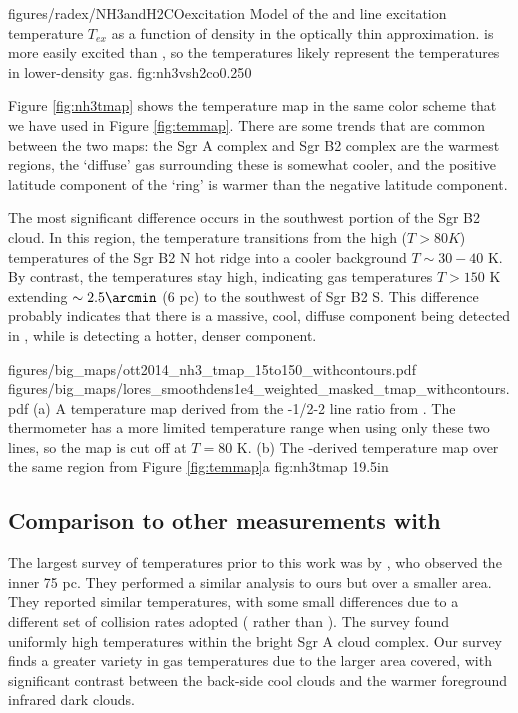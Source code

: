 \Figure
{figures/radex/NH3andH2COexcitation}
{Model of the \ammonia and \para line excitation temperature $T_{ex}$ as a function
of density in the optically thin approximation.   \ammonia is more easily
excited than \para, so the \ammonia temperatures likely represent the
temperatures in lower-density gas.}
{fig:nh3vsh2co}{0.25}{0}

Figure \ref{fig:nh3tmap} shows the \citet{Ott2014a} temperature map in the same
color scheme that we have used in Figure \ref{fig:temmap}.  There are some
trends that are common between the two maps: the Sgr A complex and Sgr B2
complex are the warmest regions, the `diffuse' gas surrounding these is
somewhat cooler, and the positive latitude component of the
\citet{Molinari2011a} `ring' is warmer than the negative latitude
component.

The most significant difference occurs in the southwest portion of the Sgr B2
cloud.  In this region, the \ammonia temperature transitions from the high
($T>80K$) temperatures of the Sgr B2 N hot ridge into a cooler background
$T\sim30-40$ K.  By contrast, the \formaldehyde temperatures stay high,
indicating gas temperatures $T>150$ K extending $\sim2.5\arcmin$ (6 pc) to the
southwest of Sgr B2 S.  This difference probably indicates that there is a
massive, cool, diffuse component being detected in \ammonia, while
\formaldehyde is detecting a hotter, denser component.

\RotFigureTwoAA
{figures/big_maps/ott2014_nh3_tmap_15to150_withcontours.pdf}
{figures/big_maps/lores_smoothdens1e4_weighted_masked_tmap_withcontours.pdf}
{(a) A temperature map derived from the -1/2-2 line ratio from
\citet{Ott2014a}.  The \ammonia thermometer has a more limited temperature
range when using only these two lines, so the map is cut off at $T=80$ K.
(b) The \para-derived temperature map over the same region from Figure
\ref{fig:temmap}a
}
{fig:nh3tmap}
{1}{9.5in}

\subsection{Comparison to other measurements with \para}
\label{sec:h2cocompare}
The largest survey of \para temperatures prior to this work was by
\citet{Ao2013a}, who observed the inner 75 pc.  They performed a similar
analysis to ours but over a smaller area.  They reported similar temperatures,
with some small differences due to a different set of collision rates adopted
(\citet{Wiesenfeld2013a} rather than \citet{Green1991a}).
The \citet{Ao2013a} survey found uniformly high temperatures within the bright
Sgr A cloud complex.  Our survey finds a greater variety in gas temperatures due
to the larger area covered, with significant contrast between the back-side
cool clouds and the warmer foreground infrared dark clouds.

